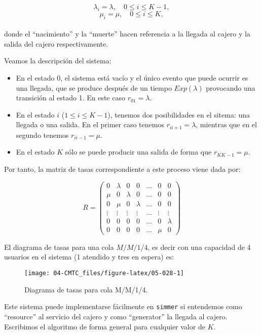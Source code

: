 \documentclass[
]{book}
\theoremstyle{definition}
\theoremstyle{definition}
\theoremstyle{definition}
\theoremstyle{definition}
\theoremstyle{remark}
\begin{document}
\[\lambda_i = \lambda, \quad 0 \leq i \leq K-1,\]
\[\mu_i = \mu, \quad 0 \leq i \leq K,\]\\
donde el ``nacimiento'' y la ``muerte'' hacen referencia a la llegada al cajero y la salida del cajero respectivamente.

Veamos la descripción del sistema:

\begin{itemize}
\item
  En el estado 0, el sistema está vacío y el único evento que puede ocurrir es una llegada, que se produce después de un tiempo \(Exp(\lambda)\) provocando una transición al estado 1. En este caso \(r_{01} = \lambda\).
\item
  En el estado \(i\) (\(1 \leq i \leq K-1\)), tenemos dos posibilidades en el sitema: una llegada o una salida. En el primer caso tenemos \(r_{i i+1} = \lambda\), mientras que en el segundo tenemos \(r_{i i-1} = \mu\).
\item
  En el estado \(K\) sólo se puede producir una salida de forma que \(r_{K K-1} = \mu\).
\end{itemize}

Por tanto, la matriz de tasas correspondiente a este proceso viene dada por:

\[R = 
\begin{pmatrix}
0 & \lambda & 0 & 0 & \ldots & 0 & 0 \\
\mu & 0 & \lambda & 0 & \ldots & 0 & 0 \\
0 & \mu & 0 & \lambda & \ldots & 0 & 0 \\
\vdots & \vdots & \vdots & \vdots & \ldots & \vdots & \vdots \\
0 & 0 & 0 & 0 & \ldots & 0 & \lambda \\
0 & 0 & 0 & 0 & \ldots &\mu & 0
\end{pmatrix} \]

El diagrama de tasas para una cola \(M/M/1/4\), es decir con una capacidad de 4 usuarios en el sistema (1 atendido y tres en espera) es:

\begin{figure}

{\centering \texttt{[image: 04-CMTC\_files/figure-latex/05-028-1]} 

}

\caption{Diagrama de tasas para cola M/M/1/4.}\label{fig:05-028}
\end{figure}

Este sistema puede implementarse fácilmente en \texttt{simmer} si entendemos como ``resource'' al servicio del cajero y como ``generator'' la llegada al cajero. Escribimos el algoritmo de forma general para cualquier valor de \(K\).
\end{document}
